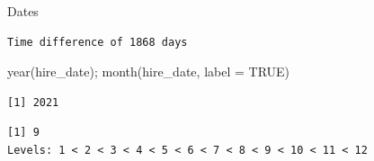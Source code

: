 \documentclass[
  ignorenonframetext,
  aspectratio=169,
]{beamer}
\newenvironment{Shaded}{\begin{snugshade}}{\end{snugshade}}
\newcommand{\AttributeTok}[1]{\textcolor[rgb]{0.40,0.45,0.13}{#1}}
\newcommand{\ConstantTok}[1]{\textcolor[rgb]{0.56,0.35,0.01}{#1}}
\newcommand{\FunctionTok}[1]{\textcolor[rgb]{0.28,0.35,0.67}{#1}}
\newcommand{\NormalTok}[1]{\textcolor[rgb]{0.00,0.23,0.31}{#1}}
\begin{document}
\begin{frame}[fragile]{Dates}
\begingroup\tiny\color{darkgray}

\begin{verbatim}
Time difference of 1868 days
\end{verbatim}

\endgroup

\begin{Shaded}
\begin{Highlighting}[]
\FunctionTok{year}\NormalTok{(hire\_date); }\FunctionTok{month}\NormalTok{(hire\_date, }\AttributeTok{label =} \ConstantTok{TRUE}\NormalTok{)}
\end{Highlighting}
\end{Shaded}

\begingroup\tiny\color{darkgray}

\begin{verbatim}
[1] 2021
\end{verbatim}

\endgroup

\begingroup\tiny\color{darkgray}

\begin{verbatim}
[1] 9
Levels: 1 < 2 < 3 < 4 < 5 < 6 < 7 < 8 < 9 < 10 < 11 < 12
\end{verbatim}

\endgroup
\end{frame}
\end{document}
